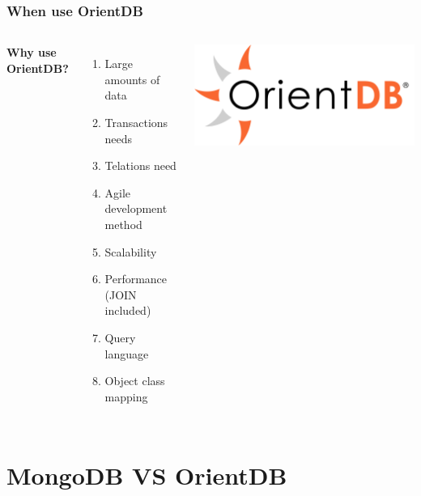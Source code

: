 \documentclass{beamer}
\begin{document}
\begin{frame}
\frametitle{When use OrientDB}
\begin{columns}[c] %

\textbf{Why use OrientDB?}
\begin{enumerate}
\item Large amounts of data
\item Transactions needs
\item Telations need
\item Agile development method
\item Scalability
\item Performance (JOIN included)
\item Query language
\item Object class mapping
\end{enumerate}

\includegraphics[width=1\linewidth]{orientdb.png}

\end{columns}
\end{frame}

\section{MongoDB VS OrientDB}
\end{document}
